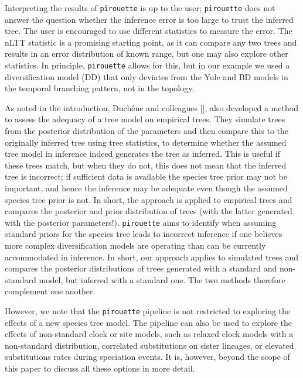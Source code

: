 Interpreting the results of \verb;pirouette; is up to the user; 
\verb;pirouette; does not answer the question 
whether the inference error is too large to trust the inferred tree. The user is encouraged to use different statistics to measure the error. The nLTT statistic is
a promising starting point, as it can compare any two trees and 
results in an error distribution of known range, but one may also explore other statistics.
In principle, \verb;pirouette; allows for this, but in our example we used a diversification model (DD) that only deviates from the Yule and BD models in the temporal branching pattern, not in the topology.

As noted in the introduction, Duch\^{e}ne and colleagues [\cite{duchene2018phylodynamic}],
also developed a method to assess the adequacy of a tree model
on empirical trees. They simulate trees from the posterior distribution of the parameters and then compare this to the originally inferred tree using tree statistics, to determine whether the assumed tree model in inference indeed generates the tree as inferred. This is useful if these trees match, but when they do not, this does not mean that the inferred tree is incorrect; if sufficient data is available the species tree prior may not be important, and hence the inference may be adequate even though the assumed species tree prior is not. In short, the approach is applied to empirical trees and compares the posterior and prior distribution of trees (with the latter generated with the posterior parameters!).
\verb;pirouette; aims to identify when assuming standard priors for the species tree leads to incorrect inference if one believes more complex diversification models are operating than can be currently accommodated in inference. In short, our approach applies to simulated trees and compares the posterior distributions of trees generated with a standard and non-standard model, but inferred with a standard one. The two methods therefore complement one another.

However, we note that the \verb;pirouette; pipeline is not restricted 
to exploring the effects of a new species tree model. 
The pipeline can also be used to explore the effects of non-standard 
clock or site models, such as relaxed clock models with a non-standard 
distribution, correlated substitutions on sister lineages, or elevated 
substitutions rates during speciation events. 
It is, however, beyond the scope of this paper to discuss all these options 
in more detail.

